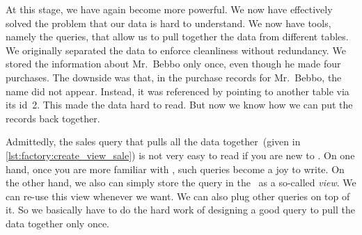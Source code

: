At this stage, we have again become more powerful.
We now have effectively solved the problem that our data is hard to understand.
We now have tools, namely the  queries, that allow us to pull together the data from different tables.
We originally separated the data to enforce cleanliness without redundancy.
We stored the information about Mr.~Bebbo only once, even though he made four purchases.
The downside was that, in the purchase records for Mr.~Bebbo, the name  did not appear.
Instead, it was referenced by pointing to another table via its id~2.
This made the data hard to read.
But now we know how we can put the records back together.

Admittedly, the sales query that pulls all the data together~(given in \cref{lst:factory:create_view_sale}) is not very easy to read if you are new to \sql.
On one hand, once you are more familiar with \sql, such queries become a joy to write.
On the other hand, we also can simply store the query in the \db\ as a so-called \emph{view}.
We can re-use this view whenever we want.
We can also plug other queries on top of it.
So we basically have to do the hard work of designing a good query to pull the data together only once.%
%
\FloatBarrier%
\endhsection%
\endhsection%
%

